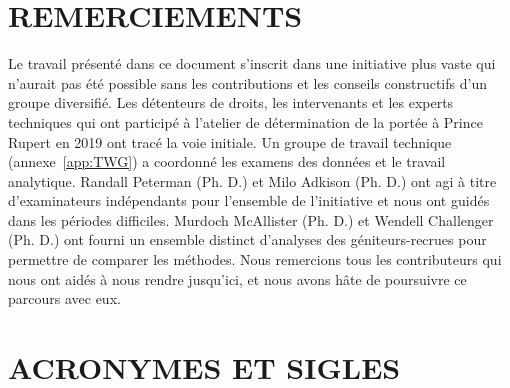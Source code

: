 \documentclass[french,11pt]{book}
\begin{document}
\section*{REMERCIEMENTS}\label{remerciements}

Le travail présenté dans ce document s'inscrit dans une initiative plus vaste qui n'aurait pas été possible sans les contributions et les conseils constructifs d'un groupe diversifié. Les détenteurs de droits, les intervenants et les experts techniques qui ont participé à l'atelier de détermination de la portée à Prince Rupert en 2019 ont tracé la voie initiale. Un groupe de travail technique (annexe~\ref{app:TWG}) a coordonné les examens des données et le travail analytique. Randall Peterman (Ph. D.) et Milo Adkison (Ph. D.) ont agi à titre d'examinateurs indépendants pour l'ensemble de l'initiative et nous ont guidés dans les périodes difficiles. Murdoch McAllister (Ph. D.) et Wendell Challenger (Ph. D.) ont fourni un ensemble distinct d'analyses des géniteurs-recrues pour permettre de comparer les méthodes. Nous remercions tous les contributeurs qui nous ont aidés à nous rendre jusqu'ici, et nous avons hâte de poursuivre ce parcours avec eux.

\section*{ACRONYMES ET SIGLES}\label{acronymes-et-sigles}
\end{document}
